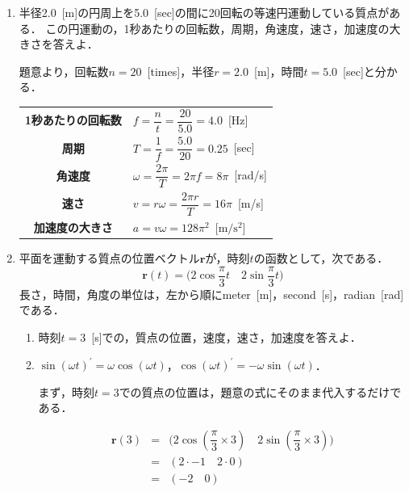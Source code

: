 \documentclass[a4paper,11pt]{ltjsarticle}
\begin{document}
\begin{enumerate}
  \item 半径2.0\ [m]の円周上を5.0\ [sec]の間に20回転の等速円運動している質点がある．
        この円運動の，1秒あたりの回転数，周期，角速度，速さ，加速度の大きさを答えよ．

  \begin{center}
    題意より，回転数$n=20$\ [times]，半径$r=2.0$\ [m]，時間$t=5.0$\ [sec]と分かる．
  \end{center}

\renewcommand{\arraystretch}{2.5}
\begin{table}[h]
  \centering
  \begin{tabular}{cl}
    \textbf{1秒あたりの回転数} & $f = \dfrac{n}{t} = \dfrac{20}{5.0} = 4.0$\ [Hz] \\
    \textbf{周期}   & $T = \dfrac{1}{f} = \dfrac{5.0}{20} = 0.25$\ [sec] \\
    \textbf{角速度} & $\omega = \dfrac{2\pi}{T} = 2\pi f = 8\pi$\ [rad/s] \\
    \textbf{速さ}   & $v = r\omega = \dfrac{2\pi r}{T} = 16\pi$\ [m/s] \\
    \textbf{加速度の大きさ} & $a = v\omega = 128\pi^2$\ [$\mathrm{m/s^2}$]
  \end{tabular}
\end{table}

  \item 平面を運動する質点の位置ベクトル$\bm{r}$が，時刻$t$の函数として，次である．
  \begin{equation}
    \bm{r}(t) = \Bigg(2\cos\dfrac{\pi}{3}t \quad 2\sin\dfrac{\pi}{3}t\Bigg)
  \end{equation}
  長さ，時間，角度の単位は，左から順にmeter\ [m]，second\ [s]，radian\ [rad]である．


  \begin{enumerate}[label=\roman*.]
    \item 時刻$t=3$\ [s]での，質点の位置，速度，速さ，加速度を答えよ．
    \item[HINT] $\sin(\omega t)^{\prime} = \omega \cos(\omega t)$，$\cos(\omega t)^{\prime} = -\omega \sin(\omega t)$．
    

    まず，時刻$t=3$での質点の位置は，題意の式にそのまま代入するだけである．

    \begin{equation}
      \begin{array}{rcl}
        \bm{r}(3) &=& \Bigg(2\cos\left(\dfrac{\pi}{3} \times 3\right) \quad 2\sin\left(\dfrac{\pi}{3} \times 3\right)\Bigg) \\
        &=& (2 \cdot -1 \quad 2 \cdot 0) \\
        &=& (-2 \quad 0)
      \end{array}
    \end{equation}


\end{enumerate}
\end{enumerate}
\end{document}
